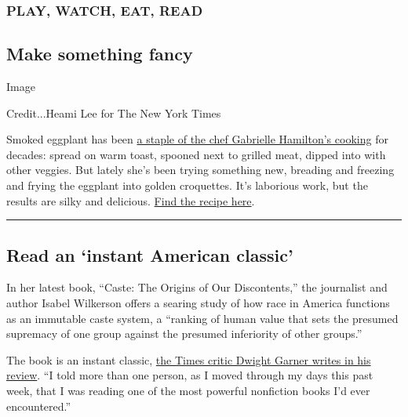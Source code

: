 \hypertarget{play-watch-eat-read}{%
\subsubsection{\texorpdfstring{\textbf{PLAY, WATCH, EAT,
READ}}{PLAY, WATCH, EAT, READ}}\label{play-watch-eat-read}}

\hypertarget{make-something-fancy}{%
\subsection{Make something fancy}\label{make-something-fancy}}

Image

Credit...Heami Lee for The New York Times

Smoked eggplant has been
\href{https://www.nytimes.com/2020/07/29/magazine/bored-with-your-home-cooking-some-smoky-eggplant-will-fix-that.html}{a
staple of the chef Gabrielle Hamilton's cooking} for decades: spread on
warm toast, spooned next to grilled meat, dipped into with other
veggies. But lately she's been trying something new, breading and
freezing and frying the eggplant into golden croquettes. It's laborious
work, but the results are silky and delicious.
\href{https://cooking.nytimes.com/recipes/1021285-smoky-eggplant-croquettes?action=click\&module=Global\%20Search\%20Recipe\%20Card\&pgType=search\&rank=2}{Find
the recipe here}.

\begin{center}\rule{0.5\linewidth}{\linethickness}\end{center}

\hypertarget{read-an-instant-american-classic}{%
\subsection{Read an `instant American
classic'}\label{read-an-instant-american-classic}}

In her latest book, ``Caste: The Origins of Our Discontents,'' the
journalist and author Isabel Wilkerson offers a searing study of how
race in America functions as an immutable caste system, a ``ranking of
human value that sets the presumed supremacy of one group against the
presumed inferiority of other groups.''

The book is an instant classic,
\href{https://www.nytimes.com/2020/07/31/books/review-caste-isabel-wilkerson-origins-of-our-discontents.html}{the
Times critic Dwight Garner writes in his review}. ``I told more than one
person, as I moved through my days this past week, that I was reading
one of the most powerful nonfiction books I'd ever encountered.''

